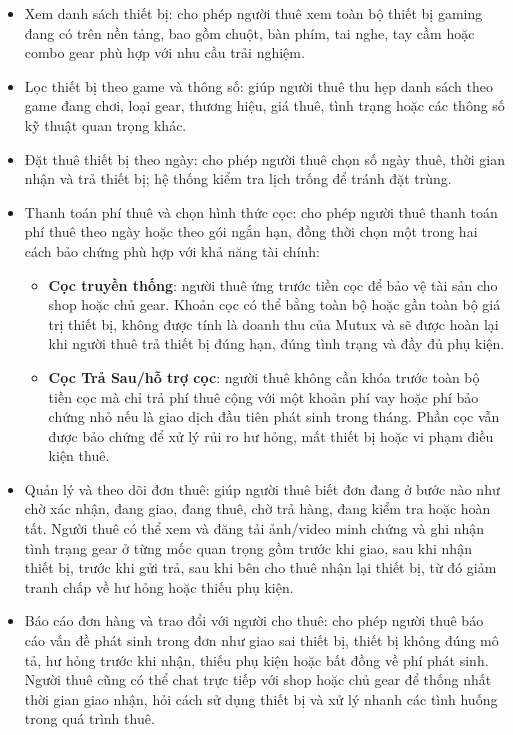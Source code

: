\begin{itemize}
    \item Xem danh sách thiết bị: cho phép người thuê xem toàn bộ thiết bị gaming đang có trên nền tảng, bao gồm chuột, bàn phím, tai nghe, tay cầm hoặc combo gear phù hợp với nhu cầu trải nghiệm.
    \item Lọc thiết bị theo game và thông số: giúp người thuê thu hẹp danh sách theo game đang chơi, loại gear, thương hiệu, giá thuê, tình trạng hoặc các thông số kỹ thuật quan trọng khác.
    \item Đặt thuê thiết bị theo ngày: cho phép người thuê chọn số ngày thuê, thời gian nhận và trả thiết bị; hệ thống kiểm tra lịch trống để tránh đặt trùng.
    \item Thanh toán phí thuê và chọn hình thức cọc: cho phép người thuê thanh toán phí thuê theo ngày hoặc theo gói ngắn hạn, đồng thời chọn một trong hai cách bảo chứng phù hợp với khả năng tài chính:
    \begin{itemize}
        \item \textbf{Cọc truyền thống}: người thuê ứng trước tiền cọc để bảo vệ tài sản cho shop hoặc chủ gear. Khoản cọc có thể bằng toàn bộ hoặc gần toàn bộ giá trị thiết bị, không được tính là doanh thu của Mutux và sẽ được hoàn lại khi người thuê trả thiết bị đúng hạn, đúng tình trạng và đầy đủ phụ kiện.
        \item \textbf{Cọc Trả Sau/hỗ trợ cọc}: người thuê không cần khóa trước toàn bộ tiền cọc mà chỉ trả phí thuê cộng với một khoản phí vay hoặc phí bảo chứng nhỏ nếu là giao dịch đầu tiên phát sinh trong tháng. Phần cọc vẫn được bảo chứng để xử lý rủi ro hư hỏng, mất thiết bị hoặc vi phạm điều kiện thuê.
    \end{itemize}
    \item Quản lý và theo dõi đơn thuê: giúp người thuê biết đơn đang ở bước nào như chờ xác nhận, đang giao, đang thuê, chờ trả hàng, đang kiểm tra hoặc hoàn tất. Người thuê có thể xem và đăng tải ảnh/video minh chứng và ghi nhận tình trạng gear ở từng mốc quan trọng gồm trước khi giao, sau khi nhận thiết bị, trước khi gửi trả, sau khi bên cho thuê nhận lại thiết bị, từ đó giảm tranh chấp về hư hỏng hoặc thiếu phụ kiện.
    \item Báo cáo đơn hàng và trao đổi với người cho thuê: cho phép người thuê báo cáo vấn đề phát sinh trong đơn như giao sai thiết bị, thiết bị không đúng mô tả, hư hỏng trước khi nhận, thiếu phụ kiện hoặc bất đồng về phí phát sinh. Người thuê cũng có thể chat trực tiếp với shop hoặc chủ gear để thống nhất thời gian giao nhận, hỏi cách sử dụng thiết bị và xử lý nhanh các tình huống trong quá trình thuê.

\end{itemize}
